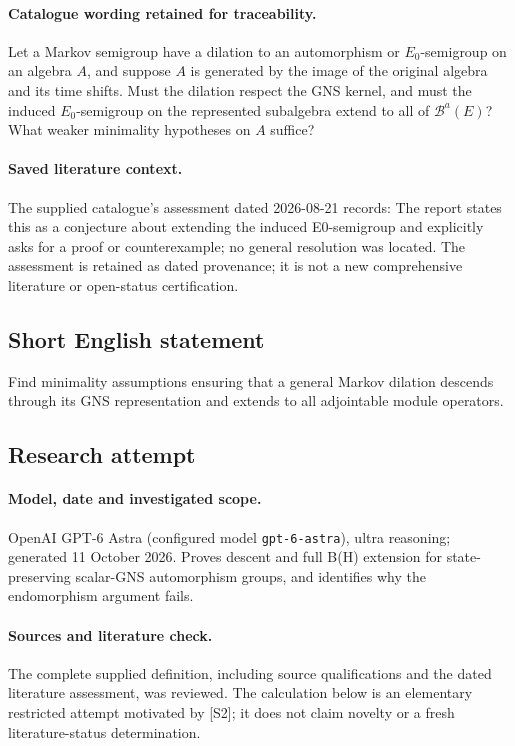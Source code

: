 \documentclass[11pt]{article}
\begin{document}
\paragraph{Catalogue wording retained for traceability.}
Let a Markov semigroup have a dilation to an automorphism or $E_0$-semigroup on an algebra $A$, and suppose $A$ is generated by the image of the original algebra and its time shifts. Must the dilation respect the GNS kernel, and must the induced $E_0$-semigroup on the represented subalgebra extend to all of $\mathcal B^a(E)$? What weaker minimality hypotheses on $A$ suffice?

\paragraph{Saved literature context.} The supplied catalogue's assessment dated 2026-08-21 records: The report states this as a conjecture about extending the induced E0-semigroup and explicitly asks for a proof or counterexample; no general resolution was located. The assessment is retained as dated provenance; it is not a new comprehensive literature or open-status certification.
\subsection{Short English statement}
Find minimality assumptions ensuring that a general Markov dilation descends through its GNS representation and extends to all adjointable module operators.
\subsection{Research attempt}
\paragraph{Model, date and investigated scope.}
OpenAI GPT-6 Astra (configured model \texttt{gpt-6-astra}), ultra reasoning; generated 11 October 2026. Proves descent and full B(H) extension for state-preserving scalar-GNS automorphism groups, and identifies why the endomorphism argument fails.

\paragraph{Sources and literature check.}
The complete supplied definition, including source qualifications and the dated literature assessment, was reviewed. The calculation below is an elementary restricted attempt motivated by [S2]; it does not claim novelty or a fresh literature-status determination.
\end{document}

